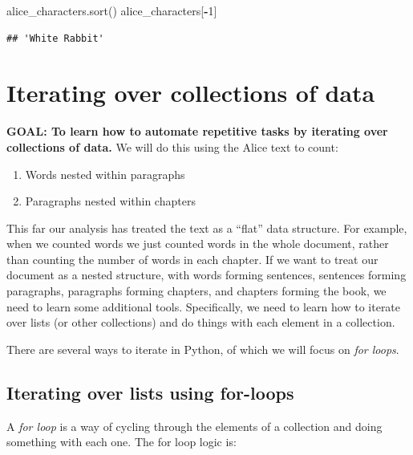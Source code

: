 \documentclass[
]{book}
\newenvironment{Shaded}{\begin{snugshade}}{\end{snugshade}}
\newcommand{\DecValTok}[1]{\textcolor[rgb]{0.00,0.00,0.81}{#1}}
\newcommand{\NormalTok}[1]{#1}
\newcommand{\OperatorTok}[1]{\textcolor[rgb]{0.81,0.36,0.00}{\textbf{#1}}}
\providecommand{\tightlist}{%
  \setlength{\itemsep}{0pt}\setlength{\parskip}{0pt}}
\begin{document}
\begin{Shaded}
\begin{Highlighting}[]
\NormalTok{alice\_characters.sort()}
\NormalTok{alice\_characters[}\OperatorTok{{-}}\DecValTok{1}\NormalTok{]}
\end{Highlighting}
\end{Shaded}

\begin{verbatim}
## 'White Rabbit'
\end{verbatim}

\hypertarget{iterating-over-collections-of-data}{%
\section{Iterating over collections of data}\label{iterating-over-collections-of-data}}

\textbf{GOAL: To learn how to automate repetitive tasks by iterating over collections of data.} We will do this using the Alice text to count:

\begin{enumerate}
\def\labelenumi{\arabic{enumi}.}
\tightlist
\item
  Words nested within paragraphs
\item
  Paragraphs nested within chapters
\end{enumerate}

This far our analysis has treated the text as a ``flat'' data structure. For example, when we counted words we just counted words in the whole document, rather than counting the number of words in each chapter. If we want to treat our document as a nested structure, with words forming sentences, sentences forming paragraphs, paragraphs forming chapters, and chapters forming the book, we need to learn some additional tools. Specifically, we need to learn how to iterate over lists (or other collections) and do things with each element in a collection.

There are several ways to iterate in Python, of which we will focus on \emph{for loops}.

\hypertarget{iterating-over-lists-using-for-loops}{%
\subsection{Iterating over lists using for-loops}\label{iterating-over-lists-using-for-loops}}

A \emph{for loop} is a way of cycling through the elements of a collection and doing something with each one. The for loop logic is:
\end{document}
